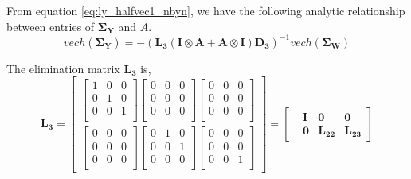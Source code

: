 \documentclass{article}
\begin{document}
From equation \ref{eq:ly_halfvec1_nbyn}, we have the following analytic relationship between entries of $\mathbf{\Sigma_Y}$ and $A$.
\begin{equation}
    vech (\boldsymbol{\Sigma}_\mathbf{Y})=
    -(\mathbf{L_3}(\mathbf{I} \otimes \mathbf{A} + \mathbf{A} \otimes \mathbf{I}) \mathbf{D_3})^{-1}vech(\boldsymbol{\Sigma}_\mathbf{W})
\label{eq:lyapunov_33_confounder}
\end{equation}

The elimination matrix $\mathbf{L_3}$ is,
\begin{equation}
\mathbf{L_3}=
\begin{bmatrix}
\left[ \begin{array}{ccc}
1 &0 &0 \\
0 &1 &0 \\
0 &0 &1 \\
\end{array} \right]
\left[ \begin{array}{ccc}
0 &0 &0 \\
0 &0 &0 \\
0 &0 &0 \\
\end{array} \right]
\left[ \begin{array}{ccc}
0 &0 &0 \\
0 &0 &0 \\
0 &0 &0 \\
\end{array} \right] \\[15pt]
\left[ \begin{array}{ccc}
0 &0 &0 \\
0 &0 &0 \\
0 &0 &0 \\
\end{array} \right]
\left[ \begin{array}{ccc}
0 &1 &0 \\
0 &0 &1 \\
0 &0 &0 \\
\end{array} \right]
\left[ \begin{array}{ccc}
0 &0 &0 \\
0 &0 &0 \\
0 &0 &1 \\
\end{array} \right]
\end{bmatrix}=
\begin{bmatrix}
&\mathbf{I} &\mathbf{0} &\mathbf{0} \\
&\mathbf{0} &\mathbf{L_{22}} &\mathbf{L_{23}}
\end{bmatrix}
\end{equation}
\end{document}
